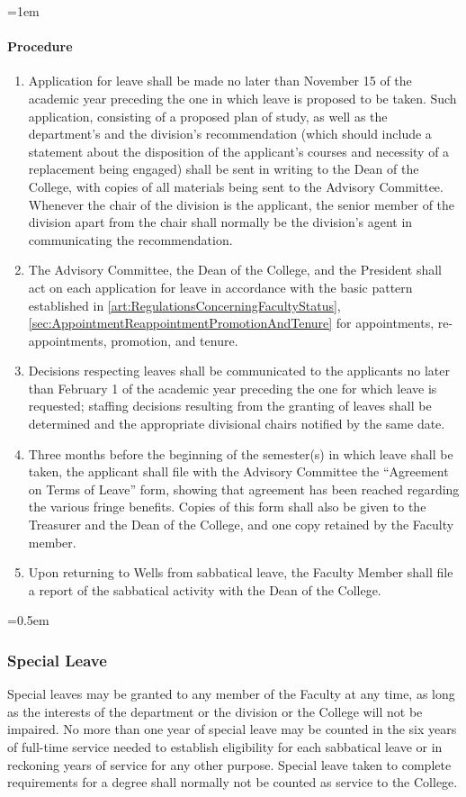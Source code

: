 \documentclass{manual}
\let\oldsubsubsection\subsubsection
\renewcommand\subsubsection{\leftskip=0.5em\oldsubsubsection}
\let\oldparagraph\paragraph
\renewcommand\paragraph{\leftskip=1em\oldparagraph}
\newcommand{\itemLevelA}{\alph*.}
\newcommand{\itemRefA}{\alph*}
\begin{document}
\paragraph{Procedure}

	\begin{enumerate}[label=\itemLevelA,ref=\itemRefA]
	\item Application for leave shall be made no later than November 15 of the academic year preceding the one in which leave is proposed to be taken. Such application, consisting of a proposed plan of study, as well as the department's and the division's recommendation (which should include a statement about the disposition of the applicant's courses and necessity of a replacement being engaged) shall be sent in writing to the Dean of the College, with copies of all materials being sent to the Advisory Committee. Whenever the chair of the division is the applicant, the senior member of the division apart from the chair shall normally be the division's agent in communicating the recommendation.
	\item The Advisory Committee, the Dean of the College, and the President shall act on each application for leave in accordance with the basic pattern established in \cref{art:RegulationsConcerningFacultyStatus}, \cref{sec:AppointmentReappointmentPromotionAndTenure} for appointments, re-appointments, promotion, and tenure.
	\item Decisions respecting leaves shall be communicated to the applicants no later than February 1 of the academic year preceding the one for which leave is requested; staffing decisions resulting from the granting of leaves shall be determined and the appropriate divisional chairs notified by the same date.
	\item Three months before the beginning of the semester(s) in which leave shall be taken, the applicant shall file with the Advisory Committee the ``Agreement on Terms of Leave'' form, showing that agreement has been reached regarding the various fringe benefits. Copies of this form shall also be given to the Treasurer and the Dean of the College, and one copy retained by the Faculty member.
	\item Upon returning to Wells from sabbatical leave, the Faculty Member shall file a report of the sabbatical activity with the Dean of the College.
	\end{enumerate}

\subsubsection{Special Leave}\label{sec:FacultyCommittees.B}
Special leaves may be granted to any member of the Faculty at any time, as long as the interests of the department or the division or the College will not be impaired. No more than one year of special leave may be counted in the six years of full-time service needed to establish eligibility for each sabbatical leave or in reckoning years of service for any other purpose. Special leave taken to complete requirements for a degree shall normally not be counted as service to the College.
\end{document}
